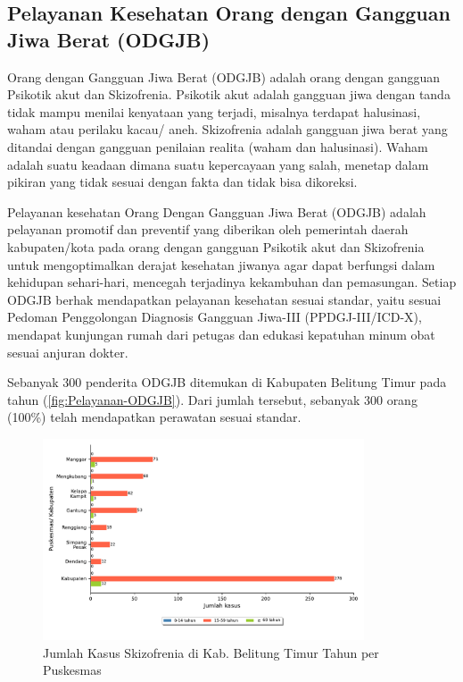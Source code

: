\subsection{Pelayanan Kesehatan Orang dengan Gangguan Jiwa Berat (ODGJB)}
Orang dengan Gangguan Jiwa Berat (ODGJB) adalah orang dengan gangguan Psikotik akut dan Skizofrenia.
Psikotik akut adalah gangguan jiwa dengan tanda tidak mampu menilai kenyataan yang terjadi, misalnya terdapat halusinasi, waham atau perilaku kacau/ aneh.
Skizofrenia adalah gangguan jiwa berat yang ditandai dengan gangguan penilaian realita (waham dan halusinasi).
Waham adalah suatu keadaan dimana suatu kepercayaan yang salah, menetap dalam pikiran yang tidak sesuai dengan fakta dan tidak bisa dikoreksi.

Pelayanan kesehatan Orang Dengan Gangguan Jiwa Berat (ODGJB) adalah pelayanan promotif dan preventif yang diberikan oleh pemerintah daerah kabupaten/kota pada orang dengan gangguan Psikotik akut dan Skizofrenia untuk mengoptimalkan derajat kesehatan jiwanya agar dapat berfungsi dalam kehidupan sehari-hari, mencegah terjadinya kekambuhan dan pemasungan.
Setiap ODGJB berhak mendapatkan pelayanan kesehatan sesuai standar, yaitu sesuai Pedoman Penggolongan Diagnosis Gangguan Jiwa-III (PPDGJ-III/ICD-X), mendapat kunjungan rumah dari petugas dan edukasi kepatuhan minum obat sesuai anjuran dokter.

Sebanyak 300 penderita ODGJB ditemukan di Kabupaten Belitung Timur pada tahun \tP (\autoref{fig:Pelayanan-ODGJB}).
Dari jumlah tersebut, sebanyak 300 orang (100\%) telah mendapatkan perawatan sesuai standar.

\begin{figure}[H]
	\centering
	\includegraphics[width=0.85\textwidth]{bab_06/bab_06_16a_skizofrenia}
	\caption{Jumlah Kasus Skizofrenia di Kab. Belitung Timur Tahun \tP per Puskesmas}
	\label{fig:Kasus-Skizofrenia}
\end{figure}

